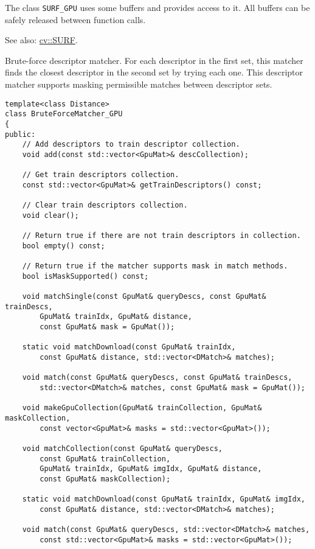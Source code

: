 The class \texttt{SURF\_GPU} uses some buffers and provides access to it. All buffers can be safely released between function calls. 

See also: \hyperref[cv.class.SURF]{cv::SURF}.


Brute-force descriptor matcher. For each descriptor in the first set, this matcher finds the closest descriptor in the second set by trying each one. This descriptor matcher supports masking permissible matches between descriptor sets.

\begin{lstlisting}
template<class Distance>
class BruteForceMatcher_GPU
{
public:
    // Add descriptors to train descriptor collection.
    void add(const std::vector<GpuMat>& descCollection);

    // Get train descriptors collection.
    const std::vector<GpuMat>& getTrainDescriptors() const;

    // Clear train descriptors collection.
    void clear();

    // Return true if there are not train descriptors in collection.
    bool empty() const;

    // Return true if the matcher supports mask in match methods.
    bool isMaskSupported() const;

    void matchSingle(const GpuMat& queryDescs, const GpuMat& trainDescs,
        GpuMat& trainIdx, GpuMat& distance,
        const GpuMat& mask = GpuMat());

    static void matchDownload(const GpuMat& trainIdx, 
        const GpuMat& distance, std::vector<DMatch>& matches);

    void match(const GpuMat& queryDescs, const GpuMat& trainDescs, 
        std::vector<DMatch>& matches, const GpuMat& mask = GpuMat());

    void makeGpuCollection(GpuMat& trainCollection, GpuMat& maskCollection,
        const vector<GpuMat>& masks = std::vector<GpuMat>());

    void matchCollection(const GpuMat& queryDescs, 
        const GpuMat& trainCollection,
        GpuMat& trainIdx, GpuMat& imgIdx, GpuMat& distance,
        const GpuMat& maskCollection);

    static void matchDownload(const GpuMat& trainIdx, GpuMat& imgIdx, 
        const GpuMat& distance, std::vector<DMatch>& matches);

    void match(const GpuMat& queryDescs, std::vector<DMatch>& matches,
        const std::vector<GpuMat>& masks = std::vector<GpuMat>());


\end{lstlisting}
